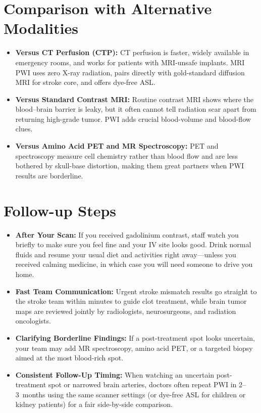 \section{Comparison with Alternative Modalities}

\begin{itemize}
    \item \textbf{Versus CT Perfusion (CTP):} CT perfusion is faster, widely available in emergency rooms, and works for patients with MRI-unsafe implants. MRI PWI uses zero X-ray radiation, pairs directly with gold-standard diffusion MRI for stroke core, and offers dye-free ASL.
    \item \textbf{Versus Standard Contrast MRI:} Routine contrast MRI shows where the blood--brain barrier is leaky, but it often cannot tell radiation scar apart from returning high-grade tumor. PWI adds crucial blood-volume and blood-flow clues.
    \item \textbf{Versus Amino Acid PET and MR Spectroscopy:} PET and spectroscopy measure cell chemistry rather than blood flow and are less bothered by skull-base distortion, making them great partners when PWI results are borderline.
\end{itemize}

\section{Follow-up Steps}

\begin{itemize}
    \item \textbf{After Your Scan:} If you received gadolinium contrast, staff watch you briefly to make sure you feel fine and your IV site looks good. Drink normal fluids and resume your usual diet and activities right away---unless you received calming medicine, in which case you will need someone to drive you home.
    \item \textbf{Fast Team Communication:} Urgent stroke mismatch results go straight to the stroke team within minutes to guide clot treatment, while brain tumor maps are reviewed jointly by radiologists, neurosurgeons, and radiation oncologists.
    \item \textbf{Clarifying Borderline Findings:} If a post-treatment spot looks uncertain, your team may add MR spectroscopy, amino acid PET, or a targeted biopsy aimed at the most blood-rich spot.
    \item \textbf{Consistent Follow-Up Timing:} When watching an uncertain post-treatment spot or narrowed brain arteries, doctors often repeat PWI in 2--3~months using the same scanner settings (or dye-free ASL for children or kidney patients) for a fair side-by-side comparison.
\end{itemize}


